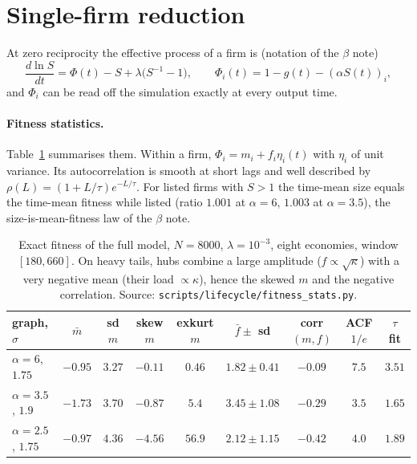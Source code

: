 \documentclass[11pt]{article}
\theoremstyle{remark}
\begin{document}
\section{Single-firm reduction}
\label{sec:reduction}

At zero reciprocity the effective process of a firm is (notation of the $\beta$ note)
\begin{equation}
  \frac{d\ln S}{dt}=\Phi(t)-S+\lambda\bigl(S^{-1}-1\bigr),\qquad
  \Phi_i(t)=1-g(t)-(\alpha S(t))_i ,
  \label{eq:process}
\end{equation}
and $\Phi_i$ can be read off the simulation exactly at every output time.

\paragraph{Fitness statistics.}  Table~\ref{tab:fitness} summarises them.  Within a firm, $\Phi_i=m_i+f_i\eta_i(t)$
with $\eta_i$ of unit variance.  Its autocorrelation is smooth at short lags and well described by
$\rho(L)=(1+L/\tau)e^{-L/\tau}$.  For listed firms with $S>1$ the time-mean size equals the time-mean fitness
while listed (ratio $1.001$ at $\alpha=6$, $1.003$ at $\alpha=3.5$), the size-is-mean-fitness law of the $\beta$
note.

\begin{table}[h]
\centering\small\setlength{\tabcolsep}{4pt}
\begin{tabular}{lcccccccc}
\toprule
graph, $\sigma$ & $\bar m$ & sd $m$ & skew $m$ & exkurt $m$ & $\bar f\pm$ sd & corr$(m,f)$ & ACF $1/e$ & $\tau$ fit\\
\midrule
$\alpha=6$, $1.75$   & $-0.95$ & $3.27$ & $-0.11$ & $0.46$  & $1.82\pm0.41$ & $-0.09$ & $7.5$ & $3.51$\\
$\alpha=3.5$, $1.9$  & $-1.73$ & $3.70$ & $-0.87$ & $5.4$   & $3.45\pm1.08$ & $-0.29$ & $3.5$ & $1.65$\\
$\alpha=2.5$, $1.75$ & $-0.97$ & $4.36$ & $-4.56$ & $56.9$  & $2.12\pm1.15$ & $-0.42$ & $4.0$ & $1.89$\\
\bottomrule
\end{tabular}
\caption{Exact fitness of the full model, $N=8000$, $\lambda=10^{-3}$, eight economies, window $[180,660]$.  On
heavy tails, hubs combine a large amplitude ($f\propto\sqrt\kappa$) with a very negative mean (their load
$\propto\kappa$), hence the skewed $m$ and the negative correlation.  Source:
\texttt{scripts/lifecycle/fitness\_stats.py}.}
\label{tab:fitness}
\end{table}
\end{document}

